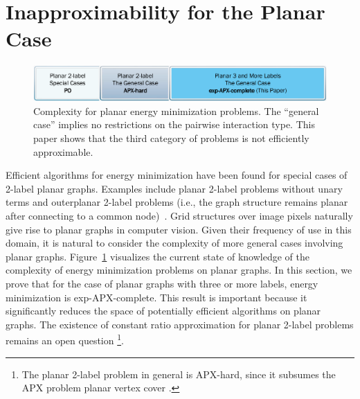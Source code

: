 \section{Inapproximability for the Planar Case} \label{sec:plcase}

\begin{figure}[b]
\begin{center}
   \includegraphics[width=1\linewidth]{figure/PlanarComplexity2.pdf}
\end{center}
   \caption{Complexity for planar energy minimization problems. The ``general case'' implies no restrictions on the pairwise interaction type.  This paper shows that the third category of problems is not efficiently approximable.}
\label{fig:planarcomp}
\end{figure}

Efficient algorithms for energy minimization have been found for special cases of 2-label planar graphs.  Examples include planar 2-label problems without unary terms and outerplanar 2-label problems (i.e., the graph structure remains planar after connecting to a common node)~\cite{Schraudolph-10}. 
Grid structures over image pixels naturally give rise to planar graphs in computer vision.  Given their frequency of use in this domain, it is natural to consider the complexity of more general cases involving planar graphs. Figure~\ref{fig:planarcomp} visualizes the current state of knowledge  of the complexity of energy minimization problems on planar graphs.  In this section, we prove that for the case of planar graphs with three or more labels, energy minimization is exp-APX-complete. This result is important because it significantly reduces the space of potentially efficient algorithms on planar graphs.  The existence of constant ratio approximation for planar 2-label problems remains an open question \footnote{The planar 2-label problem in general is APX-hard, since it subsumes the APX problem planar vertex cover \cite{Bar-Yehuda:1982:AVC:800070.802205}.}.


